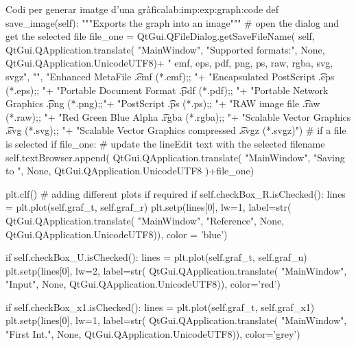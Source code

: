 \begin{code_python}{Codi per generar imatge d'una gràfica}{lab:imp:exp:graph:code}
def save_image(self):
    """Exports the graph into an image"""
    # open the dialog and get the selected file
    file_one = QtGui.QFileDialog.getSaveFileName(
         self,
         QtGui.QApplication.translate(
            "MainWindow", 
            "Supported formats:", 
            None, 
            QtGui.QApplication.UnicodeUTF8)+
            " emf, eps, pdf, png, ps, raw, rgba, svg, svgz", 
         "",
         "Enhanced MetaFile \t.emf (*.emf);; "+
         "Encapsulated PostScript \t.eps (*.eps);; "+
         "Portable Document Format \t.pdf (*.pdf);; "+
         "Portable Network Graphics \t.png (*.png);;"+
         "PostScript \t.ps (*.ps);; "+
         "RAW image file \t.raw (*.raw);; "+
         "Red Green Blue Alpha \t.rgba (*.rgba);; "+
         "Scalable Vector Graphics \t.svg (*.svg);; "+
         "Scalable Vector Graphics compressed \t.svgz (*.svgz)")
    # if a file is selected
    if file_one:
        # update the lineEdit text with the selected filename
        self.textBrowser.append(
            QtGui.QApplication.translate(
                "MainWindow", 
                "Saving to ", 
                None, 
                QtGui.QApplication.UnicodeUTF8
                )+file_one)

        plt.clf()
        # adding different plots if required
        if self.checkBox_R.isChecked():
            lines = plt.plot(self.graf_t, self.graf_r)
            plt.setp(lines[0], 
                     lw=1, 
                     label=str(
                        QtGui.QApplication.translate(
                            "MainWindow", 
                            "Reference",  
                            None, 
                            QtGui.QApplication.UnicodeUTF8)), 
                    color = 'blue')
            
        if self.checkBox_U.isChecked():
            lines = plt.plot(self.graf_t, self.graf_u)
            plt.setp(lines[0], 
                     lw=2, 
                     label=str(
                        QtGui.QApplication.translate(
                            "MainWindow", 
                            "Input",      
                            None, 
                            QtGui.QApplication.UnicodeUTF8)), 
                     color='red')
            
        if self.checkBox_x1.isChecked():
            lines = plt.plot(self.graf_t, self.graf_x1)
            plt.setp(lines[0], 
                     lw=1, 
                     label=str(
                        QtGui.QApplication.translate(
                            "MainWindow", 
                            "First Int.",  
                            None, 
                            QtGui.QApplication.UnicodeUTF8)), 
                     color='grey')
            

\end{code_python}
